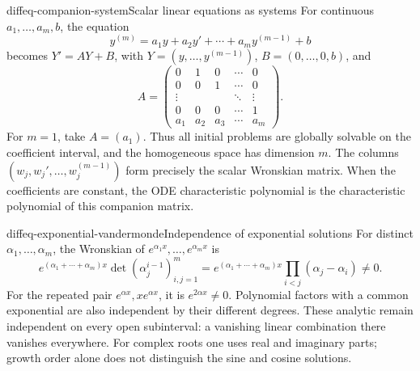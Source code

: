 \documentclass[preview]{standalone}
\begin{document}
\begin{snippetproposition}{diffeq-companion-system}{Scalar linear equations as systems}
    For continuous \(a_1,\ldots,a_m,b\), the equation
    \[
        y^{(m)}=a_1y+a_2y'+\cdots+a_my^{(m-1)}+b
    \]
    becomes \(Y'=AY+B\), with \(Y=(y,\ldots,y^{(m-1)})\), \(B=(0,\ldots,0,b)\), and
    \[
        A=\begin{pmatrix}
        0&1&0&\cdots&0\\
        0&0&1&\cdots&0\\
        \vdots&&&\ddots&\vdots\\
        0&0&0&\cdots&1\\
        a_1&a_2&a_3&\cdots&a_m
        \end{pmatrix}.
    \]
    For \(m=1\), take \(A=(a_1)\). Thus all initial problems are globally
    solvable on the coefficient interval, and the homogeneous space has dimension \(m\).
    The columns \((w_j,w_j',\ldots,w_j^{(m-1)})\) form precisely the scalar
    Wronskian matrix. When the coefficients are constant, the ODE characteristic
    polynomial is the characteristic polynomial of this companion matrix.
\end{snippetproposition}

\begin{snippetexample}{diffeq-exponential-vandermonde}{Independence of exponential solutions}
    For distinct \(\alpha_1,\ldots,\alpha_m\), the Wronskian of
    \(e^{\alpha_1x},\ldots,e^{\alpha_mx}\) is
    \[
        e^{(\alpha_1+\cdots+\alpha_m)x}
        \det(\alpha_j^{i-1})_{i,j=1}^m
        =e^{(\alpha_1+\cdots+\alpha_m)x}
           \prod_{i<j}(\alpha_j-\alpha_i)\neq0.
    \]
    For the repeated pair \(e^{\alpha x},xe^{\alpha x}\), it is
    \(e^{2\alpha x}\neq0\). Polynomial factors with a common exponential
    are also independent by their different degrees.
    These analytic \function[functions] remain independent on every open
    subinterval: a vanishing linear combination there vanishes everywhere.
    For complex roots one uses real and imaginary parts; growth order alone
    does not distinguish the sine and cosine solutions.
\end{snippetexample}
\end{document}
